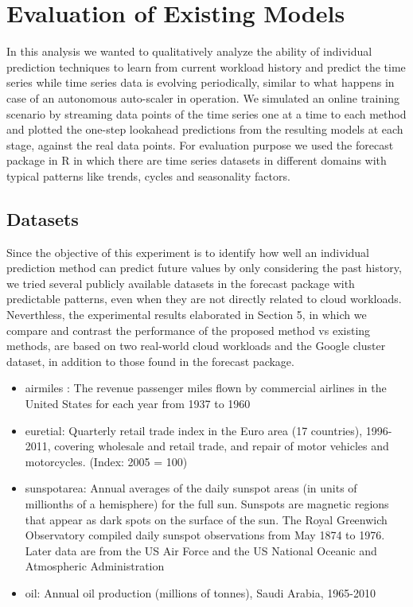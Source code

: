 \section{Evaluation of Existing Models}

In this analysis we wanted to qualitatively analyze the ability of individual prediction techniques to learn from current workload history and predict the time series while time series data is evolving periodically, similar to what happens in case of an autonomous auto-scaler in operation. We simulated an online training scenario by streaming data points of the time series one at a time to each method and plotted the one-step lookahead predictions from the resulting models at each stage, against the real data points. For evaluation purpose we used the forecast package in R \cite{forecastPackage} in which there are time series datasets in different domains with typical patterns like trends, cycles and seasonality factors.

\subsection{Datasets}
Since the objective of this experiment is to identify how well an individual prediction method can predict future values by only considering the past history, we tried several publicly available datasets in the forecast package with predictable patterns, even when they are not directly related to cloud workloads. Neverthless, the experimental results elaborated in Section 5, in which we  compare and contrast the performance of the proposed method vs existing methods, are based on two real-world cloud workloads and the Google cluster dataset, in addition to those found in the forecast package.

\begin{itemize}
\item airmiles : The revenue passenger miles flown by commercial airlines in the United States for each year from 1937 to 1960
\item euretial: Quarterly retail trade index in the Euro area (17 countries), 1996-2011, covering wholesale and retail trade, and repair of motor vehicles and motorcycles. (Index: 2005 = 100)
\item sunspotarea: Annual averages of the daily sunspot areas (in units of millionths of a hemisphere) for the full sun. Sunspots are magnetic regions that appear as dark spots on the surface of the sun. The Royal Greenwich Observatory compiled daily sunspot observations from May 1874 to 1976. Later data are from the US Air Force and the US National Oceanic and Atmospheric Administration
\item oil: Annual oil production (millions of tonnes), Saudi Arabia, 1965-2010
\end{itemize}

